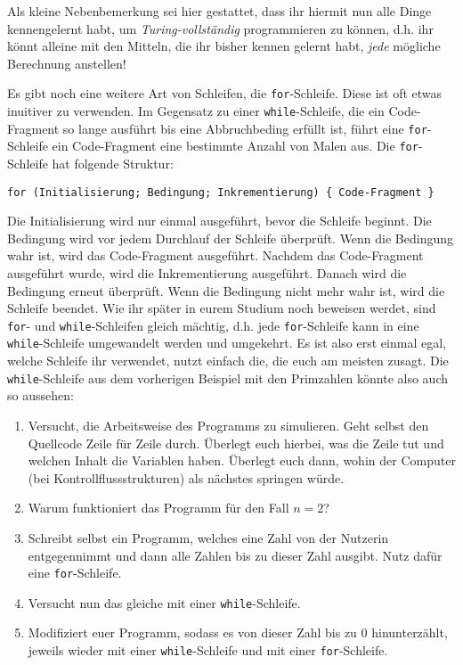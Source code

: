 Als kleine Nebenbemerkung sei hier gestattet, dass ihr hiermit nun alle Dinge
kennengelernt habt, um \emph{Turing-vollständig} programmieren zu können, d.h.
ihr könnt alleine mit den Mitteln, die ihr bisher kennen gelernt habt,
\emph{jede} mögliche Berechnung anstellen!

Es gibt noch eine weitere Art von Schleifen, die \texttt{for}-Schleife. Diese ist oft etwas inuitiver zu verwenden. Im Gegensatz zu einer \texttt{while}-Schleife, die ein Code-Fragment so lange ausführt bis eine Abbruchbeding erfüllt ist, führt eine \texttt{for}-Schleife ein Code-Fragment eine bestimmte Anzahl von Malen aus. Die \texttt{for}-Schleife hat folgende Struktur:
\begin{center}
      \texttt{for (Initialisierung; Bedingung; Inkrementierung) \{ Code-Fragment \}}
\end{center}
Die Initialisierung wird nur einmal ausgeführt, bevor die Schleife beginnt. Die Bedingung wird vor jedem Durchlauf der Schleife überprüft. Wenn die Bedingung wahr ist, wird das Code-Fragment ausgeführt. Nachdem das Code-Fragment ausgeführt wurde, wird die Inkrementierung ausgeführt. Danach wird die Bedingung erneut überprüft. Wenn die Bedingung nicht mehr wahr ist, wird die Schleife beendet. Wie ihr später in eurem Studium noch beweisen werdet, sind \texttt{for}- und \texttt{while}-Schleifen gleich mächtig, d.h. jede \texttt{for}-Schleife kann in eine \texttt{while}-Schleife umgewandelt werden und umgekehrt. Es ist also erst einmal egal, welche Schleife ihr verwendet, nutzt einfach die, die euch am meisten zusagt.\newline
Die \texttt{while}-Schleife aus dem vorherigen Beispiel mit den Primzahlen könnte also auch so aussehen:

\begin{praxis}
      \begin{enumerate}
            \item Versucht, die Arbeitsweise des Programms zu simulieren. Geht selbst
                  den Quellcode Zeile für Zeile durch. Überlegt euch hierbei, was die Zeile tut
                  und welchen Inhalt die Variablen haben. Überlegt euch dann, wohin der
                  Computer (bei Kontrollflussstrukturen) als nächstes springen würde.
            \item Warum funktioniert das Programm für den Fall $n = 2$?
            \item Schreibt selbst ein Programm, welches eine Zahl von der Nutzerin
                  entgegennimmt und dann alle Zahlen bis zu dieser Zahl ausgibt. Nutz dafür eine \texttt{for}-Schleife.
            \item Versucht nun das gleiche mit einer \texttt{while}-Schleife.
            \item Modifiziert euer Programm, sodass es von dieser Zahl bis zu 0
                  hinunterzählt, jeweils wieder mit einer \texttt{while}-Schleife und mit einer \texttt{for}-Schleife.
      \end{enumerate}
\end{praxis}

